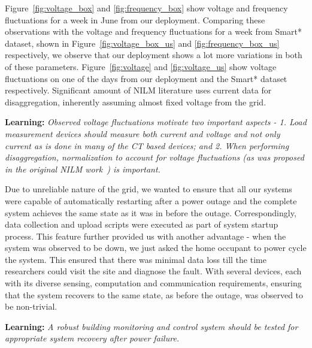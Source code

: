 \documentclass[10pt]{sensys-proc}
\newcommand{\redcolor}[1]{\textcolor{red}{#1}}
\newcommand{\figref}[1]{Figure~\ref{#1}}
\begin{document}
\figref{fig:voltage_box} and \ref{fig:frequency_box} show voltage and frequency fluctuations for a week in June from our deployment. Comparing these observations with the voltage and frequency fluctuations for a week from Smart* dataset, shown in \figref{fig:voltage_box_us} and \ref{fig:frequency_box_us} respectively, we observe that our deployment shows a lot more variations in both of these parameters. \figref{fig:voltage} and \ref{fig:voltage_us}  show voltage fluctuations on one of the days from our deployment and the Smart* dataset respectively. 
Significant amount of NILM literature uses current data
for disaggregation, inherently assuming almost fixed voltage from the grid. 

\textbf{Learning:} \emph{Observed voltage fluctuations motivate two important aspects - 1. Load measurement devices should measure both current and voltage and not only current as is done in many of the CT based devices; and 2. When performing disaggregation, normalization to account for voltage fluctuations (as was proposed in the original NILM work~\cite{hart}) is important.}

\noindent Due to unreliable nature of the grid, we wanted to ensure that all our systems were capable of automatically restarting after a power outage and the complete system achieves the same state as it was in before the outage. Correspondingly, data collection and upload scripts were executed as part of system startup process. This feature further provided us with another advantage - when the system was observed to be down, we just asked the home occupant to power cycle the system. This ensured that there was minimal data loss till the time researchers could visit the site and diagnose the fault. %
With several devices, each with its diverse sensing, computation and communication requirements, ensuring that the system recovers to the same state, as before the outage, was observed to be non-trivial. 

\textbf{Learning:} \emph{A robust building monitoring and control system should be tested for appropriate system recovery after power failure.}
\end{document}
